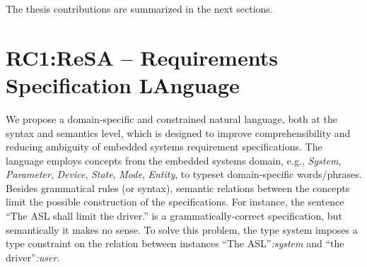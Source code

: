 The thesis contributions are summarized in the next sections. 
\section[RC1: {\sffamily \resa{}} -- \textbf{Re}quirements \textbf{S}pecification L\textbf{A}nguage]{\large RC1:{\sffamily ReSA} -- \textbf{Re}quirements \textbf{S}pecification L\textbf{A}nguage}\label{rc_resa}
We propose a domain-specific and constrained natural language, both at the syntax and semantics level, which is designed to improve comprehensibility and reducing ambiguity of embedded systems requirement specifications. The language employs concepts from the embedded systems domain, e.g., \textit{System}, \textit{Parameter}, \textit{Device}, \textit{State}, \textit{Mode}, \textit{Entity}, to typeset domain-specific words/phrases. Besides grammatical rules (or syntax), semantic relations between the concepts limit the possible construction of the specifications. For instance, the sentence ``The ASL shall limit the driver.'' is a grammatically-correct specification, but semantically it makes no sense. To solve this problem, the \resa{} type system imposes a type constraint on the relation between instances ``The ASL''\textit{:system} and ``the driver''\textit{:user}.

